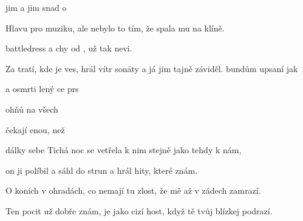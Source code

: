 
\zs
{} jim  a  jim  snad o    

Hlavu pro muziku, ale nebylo to tím, že spala mu na klíně.

 battledress a chy od ,  už tak  nevi.

Za tratí, kde je ves, hrál vítr sonáty a já jim tajně záviděl.
\ks
\zr
{}bundům upsaní jak 

a osmrti lený ce prs 


 ohňů na všech 

čekají enou, než 

 dálky sebe
\kr
\zs
Tichá noc se vetřela k nim  stejně jako tehdy k nám,

on ji políbil a sáhl do strun a hrál hity, které znám.

O koních v ohradách, co nemají tu zlost, že mě až v zádech zamrazí.

Ten pocit už dobře znám, je jako cizí host, když tě tvůj blízkej podrazí.
\ks
\zr
\kr
\kp





